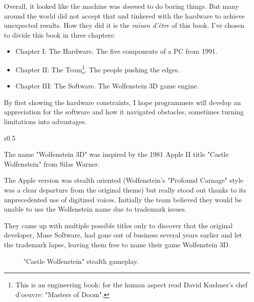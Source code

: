 Overall, it looked like the machine was \emph{doom}ed to do boring things. But many around the world did not accept that and tinkered with the hardware to achieve unexpected results. How they did it is the \textit{raison d'\^etre} of this book. I've chosen to divide this book in three chapters:
\begin{itemize}
\item Chapter I: The Hardware. The five components of a PC from 1991.
\item Chapter II: The Team\footnote{This is an engineering book: for the human aspect read David Kushner's chef d'oeuvre: "Masters of Doom".}. The people pushing the edges.
\item Chapter III: The Software. The Wolfenstein 3D game engine.
\end{itemize}
\par
By first showing the hardware constraints, I hope programmers will develop an appreciation for the software and how it navigated obstacles, sometimes turning limitations into advantages.\\
\pagebreak



\begin{wrapfigure}[11]{r}{0.5\textwidth}

\centering
{}
\end{wrapfigure}
  The name "Wolfenstein 3D" was inspired by the 1981 Apple II title "Castle Wolfenstein" from Silas Warner.\\
 \par The Apple version was stealth oriented (Wolfenstein's "Profound Carnage" style was a clear departure from the original theme) but really stood out thanks to its unprecedented use of digitized voices.
 Initially the team believed they would be unable to use the Wolfenstein name due to trademark issues.\\
 \par
 \vspace{10pt}
  They came up with multiple possible titles only to discover that the original developer, Muse Software, had gone out of business several years earlier and let the trademark lapse, leaving them free to name their game Wolfenstein 3D.



\begin{figure}[H]
\centering
{}
\caption{"Castle Wolfenstein" stealth gameplay.}
\end{figure}


